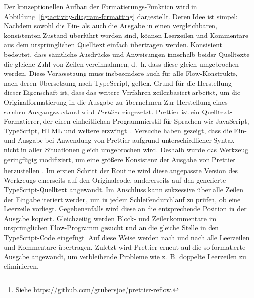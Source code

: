 \medskip
Der konzeptionellen Aufbau der Formatierungs-Funktion wird in Abbildung~\ref{fig:activity-diagram-formatting} dargestellt. Deren Idee ist simpel: Nachdem sowohl die Ein- als auch die Ausgabe in einen vergleichbaren, konsistenten Zustand überführt worden sind, können Leerzeilen und Kommentare aus dem ursprünglichen Quelltext einfach übertragen werden. Konsistent bedeutet, dass sämtliche Ausdrücke und Anweisungen innerhalb beider Quelltexte die gleiche Zahl von Zeilen vereinnahmen, d.~h. dass diese gleich umgebrochen werden. Diese Vorassetzung muss insbesondere auch für alle Flow-Konstrukte, nach deren Übersetzung nach TypeScript, gelten.
Grund für die Herstellung dieser Eigenschaft ist, dass das weitere Verfahren zeilenbasiert arbeitet, um die Originalformatierung in die Ausgabe zu übernehmen
Zur Herstellung eines solchen Ausgangszustand wird \textit{Prettier} eingesetzt. Prettier ist ein Quelltext-Formatierer, der einen einheitlichen Programmierstil für Sprachen wie JavaScript, TypeScript, HTML und weitere erzwingt~\autocite{SOFTWARE:PRETTIER}.
Versuche haben gezeigt, dass die Ein- und Ausgabe bei Anwendung von Prettier aufgrund unterschiedlicher Syntax nicht in allen Situationen gleich umgebrochen wird. Deshalb wurde das Werkzeug geringfügig modifiziert, um eine größere Konsistenz der Ausgabe von Prettier herzustellen\footnote{Siehe \url{https://github.com/grubersjoe/prettier-reflow}.}.
Im ersten Schritt der Routine wird diese angepasste Version des Werkzeugs einerseits auf den Originalcode, andererseits auf den generierte TypeScript-Quelltext angewandt. Im Anschluss kann sukzessive über alle Zeilen der Eingabe iteriert werden, um in jedem Schleifendurchlauf zu prüfen, ob eine Leerzeile vorliegt. Gegebenenfalls wird diese an die entsprechende Position in der Ausgabe kopiert. Gleichzeitig werden Block- und Zeilenkommentare im ursprünglichen Flow-Programm gesucht und an die gleiche Stelle in den TypeScript-Code eingefügt. Auf diese Weise werden nach und nach alle Leerzeilen und Kommentare übertragen. Zuletzt wird Prettier erneut auf die so formatierte Ausgabe angewandt, um verbleibende Probleme wie z.~B. doppelte Leerzeilen zu eliminieren.

